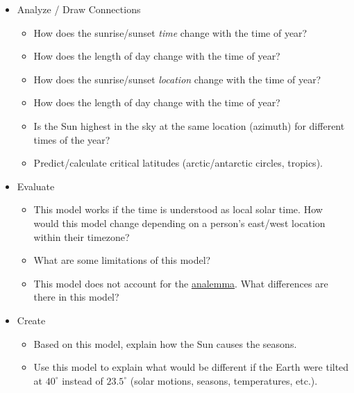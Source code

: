 \documentclass[tikz]{article}
\newif\ifPrintWishlist  %
\begin{document}
\begin{itemize}
\begin{itemize}
\begin{itemize}
\begin{itemize}
				\end{itemize}
				\item Analyze / Draw Connections
				\begin{itemize}
					\item How does the sunrise/sunset \emph{time} change with the time of year? 
					\item How does the length of day change with the time of year? 
					\item How does the sunrise/sunset \emph{location} change with the time of year? 
					\item How does the length of day change with the time of year? 
					\item Is the Sun highest in the sky at the same location (azimuth) for different times of the year? {\color{red}{(Reword)}}
					\item Predict/calculate critical latitudes (arctic/antarctic circles, tropics).
				\end{itemize}
				\item Evaluate
				\begin{itemize}
					\item This model works if the time is understood as local solar time. How would this model change depending on a person's east/west location within their timezone?
					\item What are some limitations of this model? %
					\item This model does not account for the \href{https://en.wikipedia.org/wiki/Analemma}{analemma}. What differences are there in this model? 
				\end{itemize}
				\item Create
				\begin{itemize}
					\item Based on this model, explain how the Sun causes the seasons. 
					\item Use this model to explain what would be different if the Earth were tilted at $40^\circ$ instead of $23.5^\circ$ (solar motions, seasons, temperatures, etc.). 
				\end{itemize}
				
			\end{itemize}
		\end{itemize}
	\end{itemize}

\fi %

\end{document}
